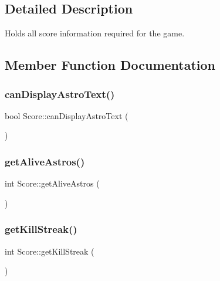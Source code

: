 \subsection{Detailed Description}
Holds all score information required for the game. 



\subsection{Member Function Documentation}
\mbox{\label{class_score_a915cd675992bb150fcd67b43f7b8732e}} 
\subsubsection{\texorpdfstring{can\+Display\+Astro\+Text()}{canDisplayAstroText()}}
{\footnotesize\ttfamily bool Score\+::can\+Display\+Astro\+Text (\begin{DoxyParamCaption}{ }\end{DoxyParamCaption})}

\mbox{\label{class_score_ad997fd059028945d10cfc8c056540a4f}} 
\subsubsection{\texorpdfstring{get\+Alive\+Astros()}{getAliveAstros()}}
{\footnotesize\ttfamily int Score\+::get\+Alive\+Astros (\begin{DoxyParamCaption}{ }\end{DoxyParamCaption})}

\mbox{\label{class_score_a3bd9796efe8e7cf9bb1c97597e56bc01}} 
\subsubsection{\texorpdfstring{get\+Kill\+Streak()}{getKillStreak()}}
{\footnotesize\ttfamily int Score\+::get\+Kill\+Streak (\begin{DoxyParamCaption}{ }\end{DoxyParamCaption})}

